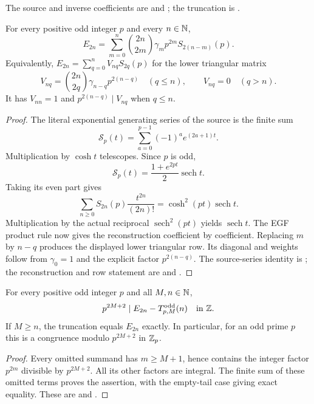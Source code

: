 The source and inverse coefficients are
 and
; the truncation is
.

\begin{theorem}
\label{thm:arith-odd-reconstruction}
For every positive odd integer $p$ and every $n\in\mathbb N$,
\[
 E_{2n}=\sum_{m=0}^{n}\binom{2n}{2m}\gamma_m p^{2m}S_{2(n-m)}(p).
\]
Equivalently, $E_{2n}=\sum_{q=0}^n V_{nq}S_{2q}(p)$ for the lower
triangular matrix
\[
 V_{nq}=\binom{2n}{2q}\gamma_{n-q}p^{2(n-q)}\quad(q\le n),
 \qquad V_{nq}=0\quad(q>n).
\]
It has $V_{nn}=1$ and $p^{2(n-q)}\mid V_{nq}$ when $q\le n$.
\end{theorem}

\begin{proof}
The literal exponential generating series of the source is the finite sum
\[
 \mathcal S_p(t)=\sum_{a=0}^{p-1}(-1)^a e^{(2a+1)t}.
\]
Multiplication by $\cosh t$ telescopes.  Since $p$ is odd,
\[
 \mathcal S_p(t)=\frac{1+e^{2pt}}{2}\operatorname{sech}t.
\]
Taking its even part gives
\[
 \sum_{n\ge0}S_{2n}(p)\frac{t^{2n}}{(2n)!}
       =\cosh^2(pt)\operatorname{sech}t.
\]
Multiplication by the actual reciprocal $\operatorname{sech}^2(pt)$
yields $\operatorname{sech}t$.  The EGF product rule now gives the
reconstruction coefficient by coefficient.  Replacing $m$ by $n-q$
produces the displayed lower triangular row.  Its diagonal and weights
follow from $\gamma_0=1$ and the explicit factor $p^{2(n-q)}$.
The source-series identity is
; the reconstruction
and row statement are
 and
.
\end{proof}

\begin{corollary}\label{cor:arith-odd-ladder}
For every positive odd integer $p$ and all $M,n\in\mathbb N$,
\[
 p^{2M+2}\mid E_{2n}-T^{\mathrm{odd}}_{p,M}(n)\quad\text{in }\mathbb Z.
\]
If $M\ge n$, the truncation equals $E_{2n}$ exactly.  In particular,
for an odd prime $p$ this is a congruence modulo $p^{2M+2}$ in $\mathbb Z_p$.
\end{corollary}

\begin{proof}
Every omitted summand has $m\ge M+1$, hence contains the integer factor
$p^{2m}$ divisible by $p^{2M+2}$.  All its other factors are integral.
The finite sum of these omitted terms proves the assertion, with the
empty-tail case giving exact equality.  These are
 and
.
\end{proof}

